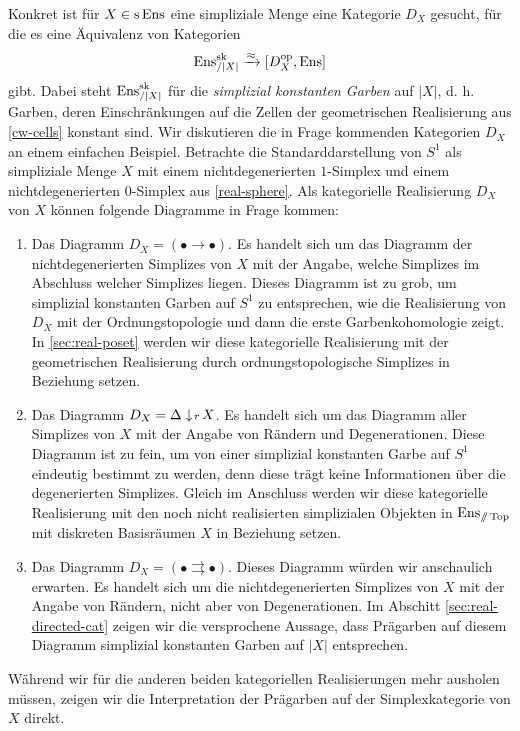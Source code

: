 Konkret ist für $X \in \operatorname{s}\operatorname{Ens}$ eine simpliziale Menge eine Kategorie
$D_X$ gesucht, für die es eine Äquivalenz von Kategorien
\[ \operatorname{Ens}_{/|X|}^{\operatorname{sk}} \xrightarrow{\approx} {[D_X^\mathrm{op}, \operatorname{Ens}]} \]
gibt. Dabei steht $\operatorname{Ens}_{/|X|}^{\operatorname{sk}}$ für die \emph{simplizial
  konstanten Garben} auf $|X|$, d. h. Garben, deren Einschränkungen
auf die Zellen der geometrischen Realisierung aus \ref{cw-cells}
konstant sind. Wir diskutieren die in Frage kommenden Kategorien $D_X$
an einem einfachen Beispiel. Betrachte die Standarddarstellung von
$S^1$ als simpliziale Menge $X$ mit einem nichtdegenerierten
$1$-Simplex und einem nichtdegenerierten $0$-Simplex aus
\ref{real-sphere}. Als kategorielle Realisierung $D_X$ von $X$ können
folgende Diagramme in Frage kommen:
\begin{enumerate}
\item Das Diagramm $D_X = (\bullet \to \bullet)$. Es handelt sich um
  das Diagramm der nichtdegenerierten Simplizes von $X$ mit der
  Angabe, welche Simplizes im Abschluss welcher Simplizes
  liegen. Dieses Diagramm ist zu grob, um simplizial konstanten Garben
  auf $S^1$ zu entsprechen, wie die Realisierung von $D_X$ mit der
  Ordnungstopologie und dann die erste Garbenkohomologie zeigt. In
  \autoref{sec:real-poset} werden wir diese kategorielle Realisierung
  mit der geometrischen Realisierung durch ordnungstopologische
  Simplizes in Beziehung setzen.
\item Das Diagramm $D_X = \Delta \downarrow \! {\scriptstyle r} \, X$. Es handelt sich um
  das Diagramm aller Simplizes von $X$ mit der Angabe von Rändern und
  Degenerationen. Diese Diagramm ist zu fein, um von einer simplizial
  konstanten Garbe auf $S^1$ eindeutig bestimmt zu werden, denn diese
  trägt keine Informationen über die degenerierten Simplizes. Gleich
  im Anschluss werden wir diese kategorielle Realisierung mit den noch
  nicht realisierten simplizialen Objekten in $\operatorname{Ens}_{\mathbin{/\mkern-6mu/} \operatorname{Top}}$ mit
  diskreten Basisräumen $X$ in Beziehung setzen.
\item Das Diagramm $D_X = (\bullet \rightrightarrows \bullet)$. Dieses
  Diagramm würden wir anschaulich erwarten. Es handelt sich um die
  nichtdegenerierten Simplizes von $X$ mit der Angabe von Rändern,
  nicht aber von Degenerationen. Im Abschitt
  \ref{sec:real-directed-cat} zeigen wir die versprochene Aussage,
  dass Prägarben auf diesem Diagramm simplizial konstanten Garben auf
  $|X|$ entsprechen.
\end{enumerate}

Während wir für die anderen beiden kategoriellen Realisierungen mehr
ausholen müssen, zeigen wir die Interpretation der Prägarben auf der
Simplexkategorie von $X$ direkt.

